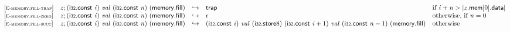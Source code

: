 \vspace{1ex}

$$
\begin{array}{@{}l@{}lcl@{}l@{}}
{[\textsc{\scriptsize E{-}memory.fill{-}trap}]} \quad & {\mathit{z}} ; (\mathsf{i{\scriptstyle32}}.\mathsf{const}~{\mathit{i}})~{\mathit{val}}~(\mathsf{i{\scriptstyle32}}.\mathsf{const}~{\mathit{n}})~(\mathsf{memory.fill}) &\hookrightarrow& \mathsf{trap} &\quad
  \mbox{if}~{\mathit{i}} + {\mathit{n}} > {|{{\mathit{z}}.\mathsf{mem}}{{}[0]}.\mathsf{data}|} \\
{[\textsc{\scriptsize E{-}memory.fill{-}zero}]} \quad & {\mathit{z}} ; (\mathsf{i{\scriptstyle32}}.\mathsf{const}~{\mathit{i}})~{\mathit{val}}~(\mathsf{i{\scriptstyle32}}.\mathsf{const}~{\mathit{n}})~(\mathsf{memory.fill}) &\hookrightarrow& \epsilon &\quad
  \mbox{otherwise, if}~{\mathit{n}} = 0 \\
{[\textsc{\scriptsize E{-}memory.fill{-}succ}]} \quad & {\mathit{z}} ; (\mathsf{i{\scriptstyle32}}.\mathsf{const}~{\mathit{i}})~{\mathit{val}}~(\mathsf{i{\scriptstyle32}}.\mathsf{const}~{\mathit{n}})~(\mathsf{memory.fill}) &\hookrightarrow& (\mathsf{i{\scriptstyle32}}.\mathsf{const}~{\mathit{i}})~{\mathit{val}}~({\mathsf{i{\scriptstyle32}}.\mathsf{store}}{8})~(\mathsf{i{\scriptstyle32}}.\mathsf{const}~{\mathit{i}} + 1)~{\mathit{val}}~(\mathsf{i{\scriptstyle32}}.\mathsf{const}~{\mathit{n}} - 1)~(\mathsf{memory.fill}) &\quad
  \mbox{otherwise} \\
\end{array}
$$

\vspace{1ex}

